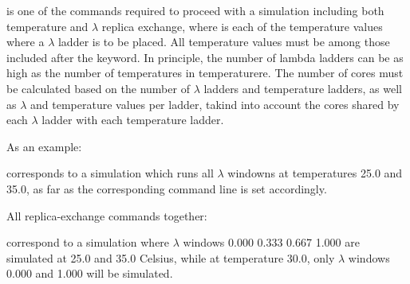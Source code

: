 \documentclass[letterpaper,10pt,english]{sphinxmanual}
\begin{document}
is one of the commands required to proceed with a simulation including both temperature and \(\lambda\) replica exchange, where  is each of the temperature values where a \(\lambda\) ladder is to be placed. All temperature values must be among those included after the  keyword. In principle, the number of lambda ladders can be as high as the number of temperatures in temperaturere. The number of cores must be calculated based on the number of \(\lambda\) ladders and temperature ladders, as well as \(\lambda\) and temperature values per ladder, takind into account the cores shared by each \(\lambda\) ladder with each temperature ladder.

As an example:

%
\begin{sphinxVerbatim}[commandchars=\\\{\}]
   
\end{sphinxVerbatim}

corresponds to a simulation which runs all \(\lambda\) windowns at temperatures 25.0 and 35.0, as far as the corresponding  command line is set accordingly.

All replica-exchange commands together:

%
\begin{sphinxVerbatim}[commandchars=\\\{\}]
     
    
   
   
\end{sphinxVerbatim}

correspond to a simulation where \(\lambda\) windows 0.000 0.333 0.667 1.000 are simulated at 25.0 and 35.0 Celsius, while at temperature 30.0, only \(\lambda\) windows 0.000 and 1.000 will be simulated.


\ignorespaces 
\def\sphinxLiteralBlockLabel{\label{\detokenize{protoms:index-51}}}
%
\begin{sphinxVerbatim}[commandchars=\\\{\}]
 
\end{sphinxVerbatim}
\end{document}
